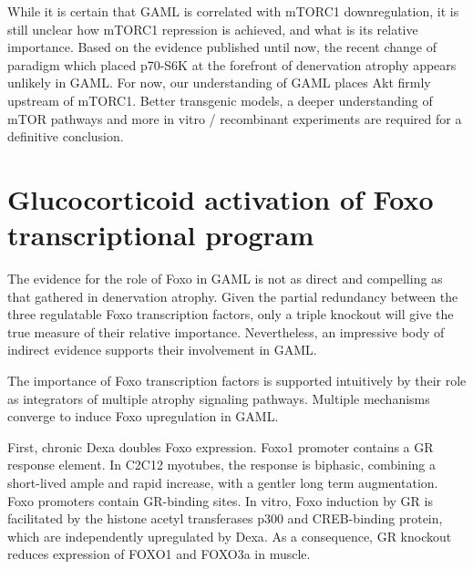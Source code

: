 \documentclass[12pt,english]{report}\usepackage[]{graphicx}\usepackage[]{color}
\begin{document}
While it is certain that GAML is correlated with mTORC1 downregulation,
it is still unclear how mTORC1 repression is achieved, and what is
its relative importance. Based on the evidence published until now,
the recent change of paradigm which placed p70-S6K at the forefront
of denervation atrophy appears unlikely in GAML. For now, our understanding
of GAML places Akt firmly upstream of mTORC1. Better transgenic models,
a deeper understanding of mTOR pathways and more in vitro / recombinant
experiments are required for a definitive conclusion.


\section{Glucocorticoid activation of Foxo transcriptional program}

The evidence for the role of Foxo in GAML is not as direct and compelling
as that gathered in denervation atrophy. Given the partial redundancy
between the three regulatable Foxo transcription factors, only a triple
knockout will give the true measure of their relative importance.
Nevertheless, an impressive body of indirect evidence supports their
involvement in GAML.

The importance of Foxo transcription factors is supported intuitively
by their role as integrators of multiple atrophy signaling pathways.
Multiple mechanisms converge to induce Foxo upregulation in GAML. 

First, chronic Dexa doubles Foxo expression\citep{wu2010redd1}. Foxo1
promoter contains a GR response element\citep{qin2014identification}.
In C2C12 myotubes, the response is biphasic, combining a short-lived
ample and rapid increase, with a gentler long term augmentation\citep{nishimura2008effects}.
Foxo promoters contain GR-binding sites\citep{lutzner2012foxo3}.
In vitro, Foxo induction by GR is facilitated by the histone acetyl
transferases p300 and CREB-binding protein, which are independently
upregulated by Dexa\citep{alamdari2010sepsis}. As a consequence,
GR knockout reduces expression of FOXO1 and FOXO3a in muscle\citep{waddell2008glucocorticoid}.
\end{document}
